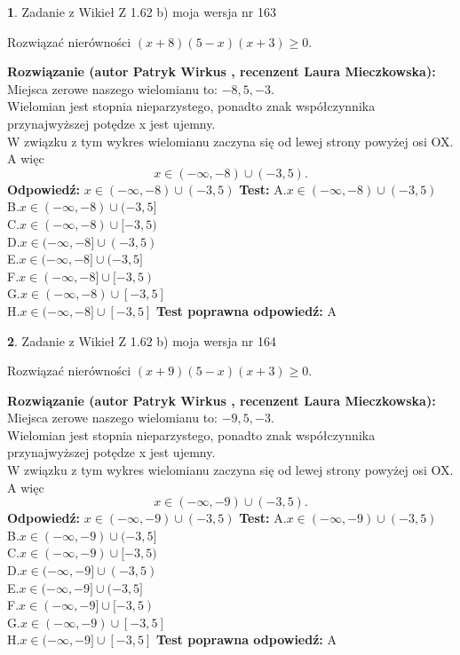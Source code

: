\documentclass[12pt, a4paper]{article}
\theoremstyle{definition} %
\newtheorem{zad}{}
\newcommand{\zadStart}[1]{\begin{zad}#1\newline}
\newcommand{\zadStop}{\end{zad}}
\newcommand{\rozwStart}[2]{\noindent \textbf{Rozwiązanie (autor #1 , recenzent #2): }\newline}
\newcommand{\rozwStop}{\newline}
\newcommand{\odpStart}{\noindent \textbf{Odpowiedź:}\newline}
\newcommand{\odpStop}{\newline}
\newcommand{\testStart}{\noindent \textbf{Test:}\newline}
\newcommand{\testStop}{\newline}
\newcommand{\kluczStart}{\noindent \textbf{Test poprawna odpowiedź:}\newline}
\newcommand{\kluczStop}{\newline}
\begin{document}
\zadStart{Zadanie z Wikieł Z 1.62 b) moja wersja nr 163}

Rozwiązać nierówności $(x+8)(5-x)(x+3)\ge0$.
\zadStop
\rozwStart{Patryk Wirkus}{Laura Mieczkowska}
Miejsca zerowe naszego wielomianu to: $-8, 5, -3$.\\
Wielomian jest stopnia nieparzystego, ponadto znak współczynnika przy\linebreak najwyższej potędze x jest ujemny.\\ W związku z tym wykres wielomianu zaczyna się od lewej strony powyżej osi OX. A więc $$x \in (-\infty,-8) \cup (-3,5).$$
\rozwStop
\odpStart
$x \in (-\infty,-8) \cup (-3,5)$
\odpStop
\testStart
A.$x \in (-\infty,-8) \cup (-3,5)$\\
B.$x \in (-\infty,-8) \cup (-3,5]$\\
C.$x \in (-\infty,-8) \cup [-3,5)$\\
D.$x \in (-\infty,-8] \cup (-3,5)$\\
E.$x \in (-\infty,-8] \cup (-3,5]$\\
F.$x \in (-\infty,-8] \cup [-3,5)$\\
G.$x \in (-\infty,-8) \cup [-3,5]$\\
H.$x \in (-\infty,-8] \cup [-3,5]$
\testStop
\kluczStart
A
\kluczStop



\zadStart{Zadanie z Wikieł Z 1.62 b) moja wersja nr 164}

Rozwiązać nierówności $(x+9)(5-x)(x+3)\ge0$.
\zadStop
\rozwStart{Patryk Wirkus}{Laura Mieczkowska}
Miejsca zerowe naszego wielomianu to: $-9, 5, -3$.\\
Wielomian jest stopnia nieparzystego, ponadto znak współczynnika przy\linebreak najwyższej potędze x jest ujemny.\\ W związku z tym wykres wielomianu zaczyna się od lewej strony powyżej osi OX. A więc $$x \in (-\infty,-9) \cup (-3,5).$$
\rozwStop
\odpStart
$x \in (-\infty,-9) \cup (-3,5)$
\odpStop
\testStart
A.$x \in (-\infty,-9) \cup (-3,5)$\\
B.$x \in (-\infty,-9) \cup (-3,5]$\\
C.$x \in (-\infty,-9) \cup [-3,5)$\\
D.$x \in (-\infty,-9] \cup (-3,5)$\\
E.$x \in (-\infty,-9] \cup (-3,5]$\\
F.$x \in (-\infty,-9] \cup [-3,5)$\\
G.$x \in (-\infty,-9) \cup [-3,5]$\\
H.$x \in (-\infty,-9] \cup [-3,5]$
\testStop
\kluczStart
A
\kluczStop
\end{document}
